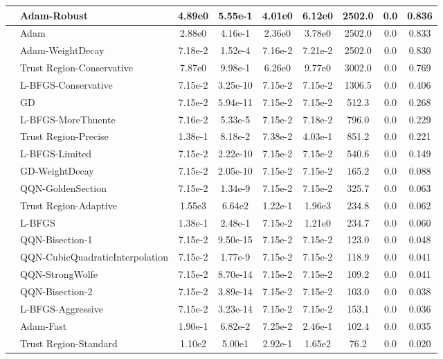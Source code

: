 \documentclass[10pt]{article}
\begin{document}
\begin{longtable}{|l|l|c|c|c|c|c|c|c|}
\hline
 & Adam-Robust & 4.89e0 & 5.55e-1 & 4.01e0 & 6.12e0 & 2502.0 & 0.0 & 0.836 \\
\hline
 & Adam & 2.88e0 & 4.16e-1 & 2.36e0 & 3.78e0 & 2502.0 & 0.0 & 0.833 \\
\hline
 & Adam-WeightDecay & 7.18e-2 & 1.52e-4 & 7.16e-2 & 7.21e-2 & 2502.0 & 0.0 & 0.830 \\
\hline
 & Trust Region-Conservative & 7.87e0 & 9.98e-1 & 6.26e0 & 9.77e0 & 3002.0 & 0.0 & 0.769 \\
\hline
 & L-BFGS-Conservative & 7.15e-2 & 3.25e-10 & 7.15e-2 & 7.15e-2 & 1306.5 & 0.0 & 0.406 \\
\hline
 & GD & 7.15e-2 & 5.94e-11 & 7.15e-2 & 7.15e-2 & 512.3 & 0.0 & 0.268 \\
\hline
 & L-BFGS-MoreThuente & 7.16e-2 & 5.33e-5 & 7.15e-2 & 7.18e-2 & 796.0 & 0.0 & 0.229 \\
\hline
 & Trust Region-Precise & 1.38e-1 & 8.18e-2 & 7.38e-2 & 4.03e-1 & 851.2 & 0.0 & 0.221 \\
\hline
 & L-BFGS-Limited & 7.15e-2 & 2.22e-10 & 7.15e-2 & 7.15e-2 & 540.6 & 0.0 & 0.149 \\
\hline
 & GD-WeightDecay & 7.15e-2 & 2.05e-10 & 7.15e-2 & 7.15e-2 & 165.2 & 0.0 & 0.088 \\
\hline
 & QQN-GoldenSection & 7.15e-2 & 1.34e-9 & 7.15e-2 & 7.15e-2 & 325.7 & 0.0 & 0.063 \\
\hline
 & Trust Region-Adaptive & 1.55e3 & 6.64e2 & 1.22e-1 & 1.96e3 & 234.8 & 0.0 & 0.062 \\
\hline
 & L-BFGS & 1.38e-1 & 2.48e-1 & 7.15e-2 & 1.21e0 & 234.7 & 0.0 & 0.060 \\
\hline
 & QQN-Bisection-1 & 7.15e-2 & 9.50e-15 & 7.15e-2 & 7.15e-2 & 123.0 & 0.0 & 0.048 \\
\hline
 & QQN-CubicQuadraticInterpolation & 7.15e-2 & 1.77e-9 & 7.15e-2 & 7.15e-2 & 118.9 & 0.0 & 0.041 \\
\hline
 & QQN-StrongWolfe & 7.15e-2 & 8.70e-14 & 7.15e-2 & 7.15e-2 & 109.2 & 0.0 & 0.041 \\
\hline
 & QQN-Bisection-2 & 7.15e-2 & 3.89e-14 & 7.15e-2 & 7.15e-2 & 103.0 & 0.0 & 0.038 \\
\hline
 & L-BFGS-Aggressive & 7.15e-2 & 3.23e-14 & 7.15e-2 & 7.15e-2 & 153.1 & 0.0 & 0.036 \\
\hline
 & Adam-Fast & 1.90e-1 & 6.82e-2 & 7.25e-2 & 2.46e-1 & 102.4 & 0.0 & 0.035 \\
\hline
 & Trust Region-Standard & 1.10e2 & 5.00e1 & 2.92e-1 & 1.65e2 & 76.2 & 0.0 & 0.020 \\

\end{longtable}
\end{document}
